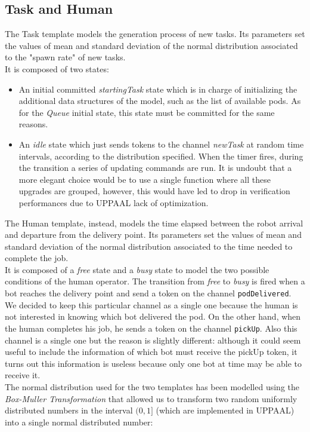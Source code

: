 \documentclass{article}
\begin{document}
		\subsection{Task and Human}
			\label{sub:TaskAndHuman}
			The Task template models the generation process of new tasks. Its parameters set the values of mean and standard deviation of the normal distribution associated to the "spawn rate" of new tasks.\\
			It is composed of two states:
			\begin{itemize}
				\item An initial committed \emph{startingTask} state which is in charge of initializing the additional data structures of the model, such as the list of available pods. As for the \emph{Queue} initial state, this state must be committed for the same reasons.
				\item An \emph{idle} state which just sends tokens to the channel \emph{newTask} at random time intervals, according to the distribution specified. When the timer fires, during the transition a series of updating commands are run. It is undoubt that a more elegant choice would be to use a single function where all these upgrades are grouped, however, this would have led to drop in verification performances due to UPPAAL lack of optimization.
			\end{itemize}
			The Human template, instead, models the time elapsed between the robot arrival and departure from the delivery point. Its parameters set the values of mean and standard deviation of the normal distribution associated to the time needed to complete the job.\\
			It is composed of a \emph{free} state and a \emph{busy} state to model the two possible conditions of the human operator. The transition from \emph{free} to \emph{busy} is fired when a bot reaches the delivery point and send a token on the channel \verb|podDelivered|. We decided to keep this particular channel as a single one because the human is not interested in knowing which bot delivered the pod. On the other hand, when the human completes his job, he sends a token on the channel \verb|pickUp|. Also this channel is a single one but the reason is slightly different: although it could seem useful to include the information of which bot must receive the pickUp token, it turns out this information is useless because only one bot at time may be able to receive it.\\
			The normal distribution used for the two templates has been modelled using the \emph{Box-Muller Transformation} that allowed us to transform two random uniformly distributed numbers in the interval $(0,1]$ (which are implemented in UPPAAL) into a single normal distributed number:
\end{document}
